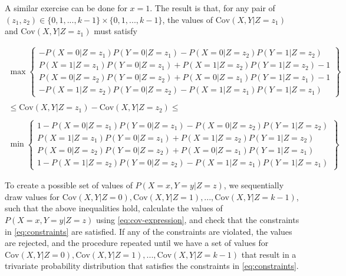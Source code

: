 \documentclass[
]{article}
\theoremstyle{plain}
\begin{document}
{A similar exercise can be done for \(x = 1\). The result is that, for any pair of \((z_1, z_2) \in \{0,1,...,k-1\} \times \{0,1,...,k-1\}\), the values of \(\text{Cov}(X, Y | Z = z_1)\) and \(\text{Cov}(X, Y | Z = z_1)\) must satisfy

\[
\begin{aligned}
  \max\left\{ 
      \begin{array}{c}
        -P(X = 0 | Z = z_1)P(Y = 0 | Z = z_1) - P(X = 0 | Z = z_2)P(Y = 1 | Z = z_2) \\ 
        P(X = 1 | Z = z_1)P(Y = 0 | Z = z_1) + P(X = 1 | Z = z_2)P(Y = 1 | Z = z_2) -1 \\
        P(X = 0 | Z = z_2)P(Y = 0 | Z = z_2) + P(X = 0 | Z = z_1)P(Y = 1 | Z = z_1) - 1 \\
        -P(X = 1 | Z = z_2)P(Y = 0 | Z = z_2) - P(X = 1 | Z = z_1)P(Y = 1 | Z = z_1)
      \end{array} 
    \right\} \qquad \qquad & \\ \\
    \le \text{Cov}(X,Y | Z = z_1) - \text{Cov}(X,Y | Z = z_2) \le \qquad \qquad \qquad \qquad  \qquad& \\ \\
    \min\left\{ 
      \begin{array}{c}
        1 -P(X = 0 | Z = z_1)P(Y = 0 | Z = z_1) - P(X = 0 | Z = z_2)P(Y = 1 | Z = z_2) \\ 
        P(X = 1 | Z = z_1)P(Y = 0 | Z = z_1) + P(X = 1 | Z = z_2)P(Y = 1 | Z = z_2) \\
        P(X = 0 | Z = z_2)P(Y = 0 | Z = z_2) + P(X = 0 | Z = z_1)P(Y = 1 | Z = z_1) \\
        1 - P(X = 1 | Z = z_2)P(Y = 0 | Z = z_2) - P(X = 1 | Z = z_1)P(Y = 1 | Z = z_1)
      \end{array} 
    \right\} & 
\end{aligned}
\]

To create a possible set of values of \(P(X = x, Y = y | Z = z)\), we sequentially draw values for \(\text{Cov}(X, Y | Z = 0), \text{Cov}(X, Y | Z = 1), ..., \text{Cov}(X, Y | Z = k-1)\), such that the above inequalities hold, calculate the values of \(P(X = x, Y = y | Z = z)\) using \eqref{eq:cov-expression}, and check that the constraints in \eqref{eq:constraints} are satisfied. If any of the constraints are violated, the values are rejected, and the procedure repeated until we have a set of values for \(\text{Cov}(X, Y | Z = 0), \text{Cov}(X, Y | Z = 1), ..., \text{Cov}(X, Y | Z = k-1)\) that result in a trivariate probability distribution that satisfies the constraints in \eqref{eq:constraints}.

}
\end{document}

